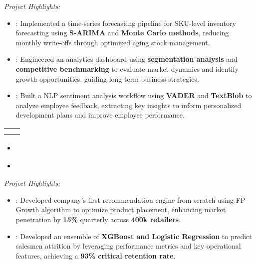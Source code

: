 \documentclass[letter paper,11pt]{article}
\makeatletter
\newcommand{\resumeItem}[1]{
\justifying
\vspace{-2.7px}
  \item{
    \fontsize{10.3pt}{11pt}\selectfont{#1}
  }
}
\newcommand{\resumeProject}[2]{
  \justifying
  \vspace{1px}
  \item[\textbf{-}]{\small{\fontseries{b}\selectfont{#1}}: {#2}}
}
\newcommand{\resumeSubheading}[4]{%
  \item
    \begin{tabular*}
    {1\textwidth}
    {l@{\extracolsep{\fill}}r}
      \textbf{\fontsize{11.5pt}{13pt}\selectfont{#1}} & {\fontsize{10.5pt}{13pt}\selectfont{#2}}
      \\
      {\fontsize{11pt}{12pt}\selectfont{#3}} & {\fontsize{10.5pt}{13pt}\selectfont{#4}} \\
    \end{tabular*}%
  \vspace{-0.5cm}
}
\newcommand{\resumeItemListStart}{\vspace{1pt}\begin{itemize}}
\newcommand{\resumeItemListEnd}{\end{itemize}}
\makeatother
\begin{document}
    \vspace{-5pt}
    {\small \textsl{{Project Highlights:}}}
    \vspace{-5pt}
    \begin{itemize}
    \resumeProject{Inventory Forecasting}{Implemented a time-series forecasting pipeline for SKU-level inventory forecasting using {\textbf{S-ARIMA}} and {\textbf{Monte Carlo methods}}, reducing monthly write-offs through optimized aging stock management.}

    
    \resumeProject{Market Share and Growth Analytics}{Engineered an analytics dashboard using \textbf{segmentation analysis} and \textbf{competitive benchmarking} to evaluate market dynamics and identify growth opportunities, guiding long-term business strategies.}
    
    \resumeProject{Individual Development Plans}{Built a NLP sentiment analysis workflow using \textbf{VADER} and \textbf{TextBlob} to analyze employee feedback, extracting key insights to inform personalized development plans and improve employee performance.}
    \end{itemize}

    \vspace{4pt}
    \resumeSubheading
    {Data Science Intern}
    {Mumbai, India}
    {Piramal Consumer Healthcare (PCH)}
    {Jul 2021 -- Dec 2021}{}
    \vspace{4pt}
    \resumeItemListStart
    \resumeItem{Worked with cross-functional teams to develop analytical solutions for sales optimization and employee retention.}
    \resumeItem{Recognized for exceptional performance, leading to an offer for the Data Science Lead role at Piramal Critical Care.}
    \resumeItemListEnd
    \vspace{-5pt}
    {\small \textsl{{Project Highlights:}}}
    \vspace{-5pt}
    \begin{itemize}
    \resumeProject{Product Recommendation Engine}{Developed company's first recommendation engine from scratch using FP-Growth algorithm to optimize product placement, enhancing market penetration by \textbf{15\%} quarterly across \textbf{400k retailers}.}
    
    \resumeProject{Attrition Prediction Modelling}{Developed an ensemble of \textbf{XGBoost and Logistic Regression} to predict salesmen attrition by leveraging performance metrics and key operational features, achieving a \textbf{93\% critical retention rate}.}
    \end{itemize}
\end{document}
